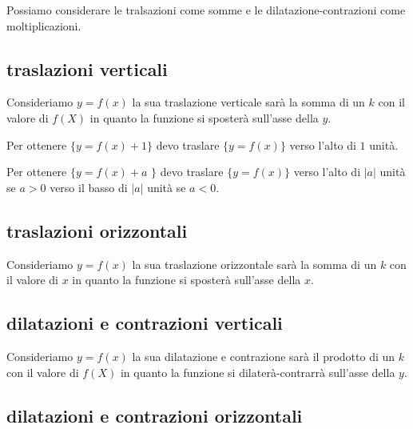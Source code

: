\documentclass[../main.tex, class=article, 12pt]{subfiles}
\begin{document}
Possiamo considerare le tralsazioni come somme e le dilatazione-contrazioni come moltiplicazioni. 

\subsection{traslazioni verticali}\label{sec:traslazioni_verticali}
Consideriamo $ y = f(x) $ la sua traslazione verticale sarà la somma di un $ k $ con il valore di $ f(X) $ in quanto la funzione si sposterà sull'asse della $ y $. \par

Per ottenere $ \{y = f(x)+1\} $ devo traslare $   \{y = f(x)\} $ verso l'alto di $ 1 $ unità. \par
Per ottenere $ \{y = f(x)+a$  $\} $ devo traslare $   \{y = f(x)\} $ verso l'alto di $ |a| $ unità se $a > 0$ verso il basso di $ |a| $ unità se $ a < 0 $. \newline



\subsection{traslazioni orizzontali}\label{sec:traslazioni_orizzontali}
Consideriamo $ y = f(x) $ la sua traslazione orizzontale sarà la somma di un $ k $ con il valore di $ x $ in quanto la funzione si sposterà sull'asse della $ x $. \par



\subsection{dilatazioni e contrazioni verticali}\label{sec:dilatazioni_e_contrazioni_verticali}
Consideriamo $ y = f(x) $ la sua dilatazione e contrazione sarà il prodotto di un $ k $ con il valore di $ f(X) $ in quanto la funzione si dilaterà-contrarrà sull'asse della $ y $. \par




\subsection{dilatazioni e contrazioni orizzontali}\label{sec:dilatazioni_e_contrazioni_verticali}
\end{document}
